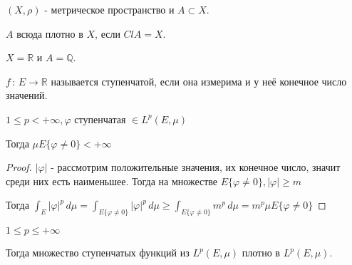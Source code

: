 \begin{definition}
    $(X, \rho)$ - метрическое пространство и $A \subset X$.

    $A$ всюда плотно в $X$, если $Cl A = X$.

    \begin{example}
        $X = \mathbb{R}$ и $A = \mathbb{Q}$.
    \end{example}
\end{definition}

\begin{definition}
    $f \, : \, E \to \mathbb{R}$ называется ступенчатой, если она измерима и у неё конечное число значений.
\end{definition}

\begin{lemma}
    $1 \leqslant p < +\infty, \varphi$ ступенчатая $\in L^p (E, \mu)$

    Тогда $\mu E \{ \varphi \neq 0 \} < +\infty$
\end{lemma}

\begin{proof}
    $|\varphi|$ - рассмотрим положительные значения, их конечное число, значит среди них есть наименьшее. Тогда 
    на множестве $E \{ \varphi \neq 0 \}, |\varphi| \geqslant m$

    Тогда $\int_E |\varphi|^p \, d\mu = \int_{E \{ \varphi \neq 0 \}} |\varphi|^p \, d\mu \geqslant \int_{E \{ \varphi \neq 0 \}} m^p \, d\mu = m^p \mu E \{ \varphi \neq 0 \}$
\end{proof}

\begin{theorem}
    $1 \leqslant p \leqslant +\infty$

    Тогда множество ступенчатых функций из $L^p (E, \mu)$ плотно в $L^p (E, \mu)$.
\end{theorem}

